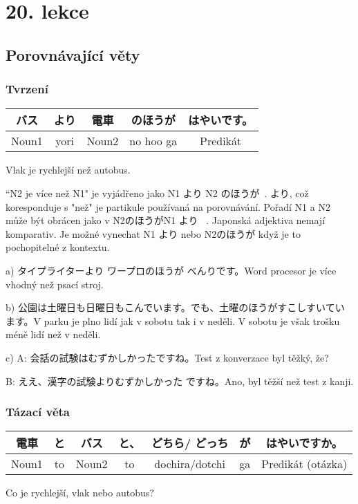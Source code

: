 \section{20. lekce}
\label{sec:lekce_20}

\subsection{Porovnávající věty}
\subsubsection{Tvrzení}

\begin{center}
\begin{tabular}{|c|c|c|c|c|}
\hline
バス&より&電車&のほうが&はやいです。\\
\hline
Noun1&yori&Noun2&no hoo ga&Predikát\\
\hline
\end{tabular}
\end{center}

 Vlak je rychlejší než autobus.


“N2 je více než N1" je vyjádřeno jako  N1 より N2 のほうが~.  より, což koresponduje s "než" je partikule používaná na porovnávání. Pořadí N1 a N2 může být obrácen jako v N2のほうがN1 より ~. Japonská adjektiva nemají komparativ. Je možné vynechat  N1 より nebo N2のほうが když je to pochopitelné z kontextu.

a) タイプライターより ワープロのほうが べんりです。Word procesor je více vhodný než psací stroj.

b) 公園は土曜日も日曜日もこんでいます。でも、土曜のほうがすこしすいています。V parku je plno lidí jak v sobotu tak i v neděli. V sobotu je však trošku méně lidí než v neděli.

c) A: 会話の試験はむずかしかったですね。Test z konverzace byl těžký, že?

B: ええ、漢字の試験よりむずかしかった ですね。Ano, byl těžší než test z kanji.

\subsubsection{Tázací věta}
\begin{center}
\begin{tabular}{|c|c|c|c|c|c|c|}
\hline
電車&と& バス&と、&どちら/ どっち&が& はやいですか。\\
\hline
Noun1 &to&Noun2&to&dochira/dotchi&ga&Predikát (otázka)\\
\hline
\end{tabular}
\end{center}
Co je rychlejší, vlak nebo autobus?

